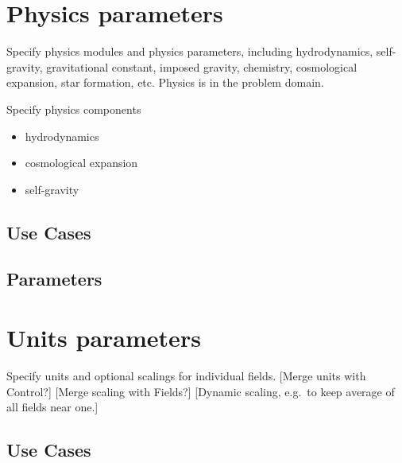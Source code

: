 \documentclass{book}
\begin{document}
\section{Physics parameters} \label{s:physics}

Specify physics modules and physics parameters, including
hydrodynamics, self-gravity, gravitational constant, imposed gravity,
chemistry, cosmological expansion, star formation, etc.  Physics is in
the problem domain.

Specify physics components

\begin{itemize}
\item hydrodynamics
\item  cosmological expansion
\item self-gravity
\end{itemize}

\subsection{Use Cases}
\subsection{Parameters}

\section{Units parameters} \label{s:units}

 Specify units and optional scalings for individual
 fields.  [Merge units with Control?] [Merge scaling with Fields?] 
 [Dynamic scaling, e.g.~to keep average of all fields near one.]

\subsection{Use Cases}
\end{document}
